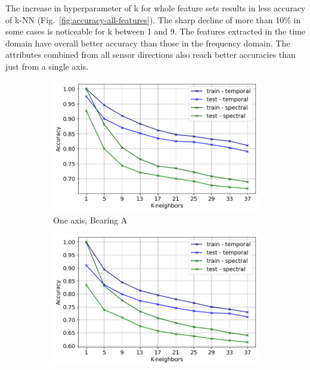 \documentclass{llncs}
\begin{document}
The increase in hyperparameter of k for whole feature sets results in less accuracy of k-NN (Fig.~\ref{fig:accuracy-all-features}). The sharp decline of more than 10\% in some cases is noticeable for k between 1 and 9. The features extracted in the time domain have overall better accuracy than those in the frequency domain. The attributes combined from all sensor directions also reach better accuracies than just from a single axis.

\begin{figure}
	\centering
     \begin{subfigure}[b]{0.32\textwidth}
         \centering
         \includegraphics[width=\textwidth]{fig/all-features-mafaulda/one-axis-a-bearing.png}
         \caption{One axis, Bearing A}
     \end{subfigure}
     \hfill
     \begin{subfigure}[b]{0.32\textwidth}
         \centering
         \includegraphics[width=\textwidth]{fig/all-features-mafaulda/one-axis-all-bearings.png}

\end{subfigure}
\end{figure}
\end{document}
